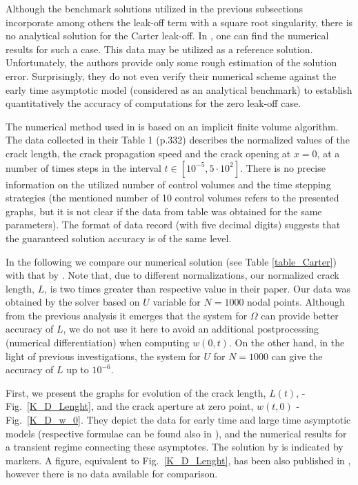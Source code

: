 Although the benchmark solutions utilized in the previous
subsections incorporate among others the leak-off term with a square root
singularity, there is no analytical solution for the Carter leak-off. In
\citet{Kovalyshen}, one can find the numerical results for such a case. This data may be utilized as a reference
solution. Unfortunately, the authors provide only some rough
estimation of the solution error. Surprisingly, they do not even
verify their numerical scheme against the early time asymptotic
model (considered as an analytical benchmark) to establish
quantitatively the accuracy of computations for the zero leak-off
case.

The numerical method used in \citet{Kovalyshen} is based on an
implicit finite volume algorithm. The data collected  in their Table 1 (p.332)
describes the normalized values of the crack length, the crack propagation speed and
the crack opening at $x=0$, at a number of times steps in the
interval $t\in [10^{-5},5\cdot 10^2]$. There is no precise
information on the utilized number of control volumes and the time
stepping strategies (the mentioned number of 10 control volumes
refers to the presented graphs, but it is not clear if the data from
table was obtained for the same parameters). The format of data
record (with five decimal digits) suggests that the guaranteed
solution accuracy is of the same level.


In the following we compare our numerical solution (see  Table \ref{table_Carter}) with that
by \citet{Kovalyshen}. Note that, due to different normalizations, our normalized  crack length, $L$, is two times greater than respective value in their paper. Our data was
obtained by the solver based on $U$ variable for $N=1000$ nodal points. Although
from the previous analysis it emerges that the system for $\Omega$
can provide better accuracy of $L$, we do not use it here to avoid an
additional postprocessing (numerical differentiation) when computing $w(0,t)$. On the other hand, in the light of previous
investigations, the system for $U$ for $N=1000$ can give the
accuracy of $L$ up to $10^{-6}$.


First, we present the graphs for evolution of the crack length, $L(t)$, -
Fig.~\ref{K_D_Lenght}, and the crack aperture at zero point, $w(t,0)$ - Fig.~\ref{K_D_w_0}. They depict the data for early time and
large time asymptotic models (respective formulae can be found also in
\citet{Kovalyshen}), and the numerical results
for a transient regime connecting these asymptotes. The solution by
\citet{Kovalyshen} is indicated by markers. A figure, equivalent to Fig.~\ref{K_D_Lenght}, has been also published in \citet{Nordgren}, however there is no data
available for comparison.

